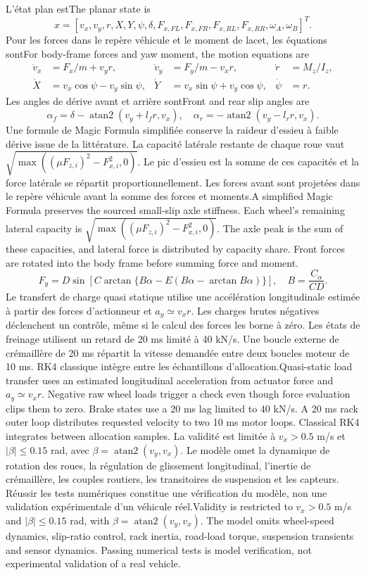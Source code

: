 \documentclass[11pt,a4paper,oneside]{report}
\newcommand{\bi}[2]{\iffrench #2\else #1\fi}
\begin{document}
\bi{The planar state is}{L'état plan est}
\[
x=[v_x,v_y,r,X,Y,\psi,\delta,F_{x,FL},F_{x,FR},F_{x,RL},F_{x,RR},\omega_A,\omega_B]^T.
\]
\bi{For body-frame forces and yaw moment, the motion equations are}{Pour les forces dans le repère véhicule et le moment de lacet, les équations sont}
\begin{align*}
\dot v_x&=F_x/m+v_y r,&\dot v_y&=F_y/m-v_x r,&\dot r&=M_z/I_z,\\
\dot X&=v_x\cos\psi-v_y\sin\psi,&\dot Y&=v_x\sin\psi+v_y\cos\psi,&\dot\psi&=r.
\end{align*}
\bi{Front and rear slip angles are}{Les angles de dérive avant et arrière sont}
\[
\alpha_f=\delta-\operatorname{atan2}(v_y+l_fr,v_x),\quad
\alpha_r=-\operatorname{atan2}(v_y-l_rr,v_x).
\]
\bi{A simplified Magic Formula preserves the sourced small-slip axle stiffness. Each wheel's remaining lateral capacity is $\sqrt{\max((\mu F_{z,i})^2-F_{x,i}^2,0)}$. The axle peak is the sum of these capacities, and lateral force is distributed by capacity share. Front forces are rotated into the body frame before summing force and moment.}{Une formule de Magic Formula simplifiée conserve la raideur d'essieu à faible dérive issue de la littérature. La capacité latérale restante de chaque roue vaut $\sqrt{\max((\mu F_{z,i})^2-F_{x,i}^2,0)}$. Le pic d'essieu est la somme de ces capacités et la force latérale se répartit proportionnellement. Les forces avant sont projetées dans le repère véhicule avant la somme des forces et moments.}
\[
F_y=D\sin\!\left[C\arctan\{B\alpha-E(B\alpha-\arctan B\alpha)\}\right],\quad B=\frac{C_{\alpha}}{CD}.
\]
\bi{Quasi-static load transfer uses an estimated longitudinal acceleration from actuator force and $a_y\simeq v_xr$. Negative raw wheel loads trigger a check even though force evaluation clips them to zero. Brake states use a 20 ms lag limited to 40 kN/s. A 20 ms rack outer loop distributes requested velocity to two 10 ms motor loops. Classical RK4 integrates between allocation samples.}{Le transfert de charge quasi statique utilise une accélération longitudinale estimée à partir des forces d'actionneur et $a_y\simeq v_xr$. Les charges brutes négatives déclenchent un contrôle, même si le calcul des forces les borne à zéro. Les états de freinage utilisent un retard de 20 ms limité à 40 kN/s. Une boucle externe de crémaillère de 20 ms répartit la vitesse demandée entre deux boucles moteur de 10 ms. RK4 classique intègre entre les échantillons d'allocation.}
\bi{Validity is restricted to $v_x>0.5$ m/s and $|\beta|\le0.15$ rad, with $\beta=\operatorname{atan2}(v_y,v_x)$. The model omits wheel-speed dynamics, slip-ratio control, rack inertia, road-load torque, suspension transients and sensor dynamics. Passing numerical tests is model verification, not experimental validation of a real vehicle.}{La validité est limitée à $v_x>0.5$ m/s et $|\beta|\le0.15$ rad, avec $\beta=\operatorname{atan2}(v_y,v_x)$. Le modèle omet la dynamique de rotation des roues, la régulation de glissement longitudinal, l'inertie de crémaillère, les couples routiers, les transitoires de suspension et les capteurs. Réussir les tests numériques constitue une vérification du modèle, non une validation expérimentale d'un véhicule réel.}
\end{document}
